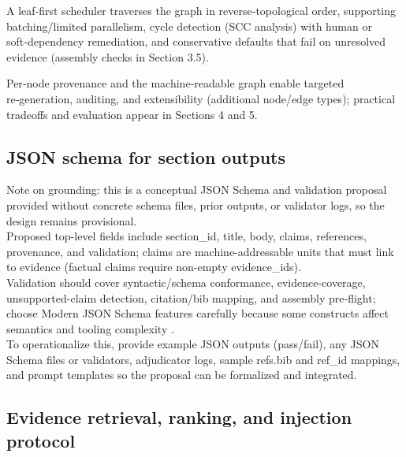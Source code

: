 \documentclass{article}%
\begin{document}
A leaf‑first scheduler traverses the graph in reverse‑topological order, supporting batching/limited parallelism, cycle detection (SCC analysis) with human or soft‑dependency remediation, and conservative defaults that fail on unresolved evidence (assembly checks in Section 3.5).

Per‑node provenance and the machine‑readable graph enable targeted re‑generation, auditing, and extensibility (additional node/edge types); practical tradeoffs and evaluation appear in Sections 4 and 5.%

%
\subsection{JSON schema for section outputs}%


%
Note on grounding: this is a conceptual JSON Schema and validation proposal provided without concrete schema files, prior outputs, or validator logs, so the design remains provisional.\\
Proposed top-level fields include section\_id, title, body, claims, references, provenance, and validation; claims are machine-addressable units that must link to evidence (factual claims require non-empty evidence\_ids).\\
Validation should cover syntactic/schema conformance, evidence-coverage, unsupported-claim detection, citation/bib mapping, and assembly pre‑flight; choose Modern JSON Schema features carefully because some constructs affect semantics and tooling complexity \cite{2307.10034v2,2503.11288v1,2202.12849v3}.\\
To operationalize this, provide example JSON outputs (pass/fail), any JSON Schema files or validators, adjudicator logs, sample refs.bib and ref\_id mappings, and prompt templates so the proposal can be formalized and integrated.%

%
\subsection{Evidence retrieval, ranking, and injection protocol}%
\end{document}
